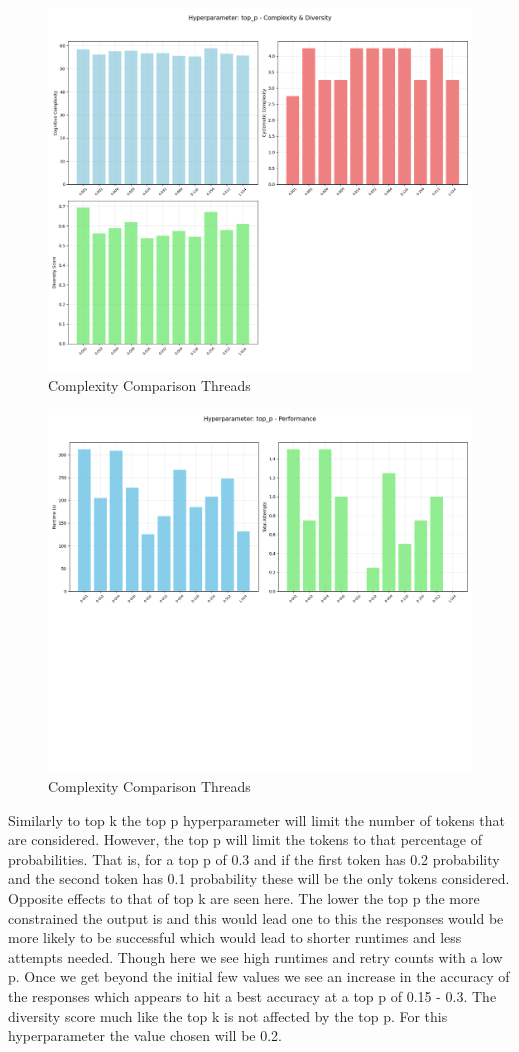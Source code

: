 \documentclass[12pt]{extarticle}
\begin{document}
\begin{figure}[H]
\centering
\includegraphics[width=0.7\linewidth]{Images/Hyperparam_top_p_Complexity.png}
\caption{Complexity Comparison Threads}
\label{fig:Complexity_Comparison_Threads}
\end{figure}

\begin{figure}[H]
\centering
\includegraphics[width=0.7\linewidth]{Images/Hyperparam_top_p_Performance.png}
\caption{Complexity Comparison Threads}
\label{fig:Complexity_Comparison_Threads}
\end{figure}

Similarly to top k the top p hyperparameter will limit the number of tokens that are considered. However, the top p will limit the tokens to that percentage of probabilities. That is, for a top p of 0.3 and if the first token has 0.2 probability and the second token has 0.1 probability these will be the only tokens considered. Opposite effects to that of top k are seen here. The lower the top p the more constrained the output is and this would lead one to this the responses would be more likely to be successful which would lead to shorter runtimes and less attempts needed. Though here we see high runtimes and retry counts with a low p. Once we get beyond the initial few values we see an increase in the accuracy of the responses which appears to hit a best accuracy at a top p of 0.15 - 0.3. The diversity score much like the top k is not affected by the top p. For this hyperparameter the value chosen will be 0.2.
\end{document}

